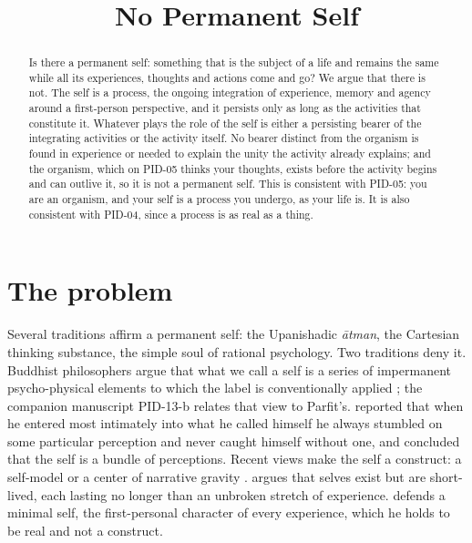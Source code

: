 \documentclass{situationist-preprint}
\title{No Permanent Self}
\begin{document}
\maketitle

\begin{abstract}
Is there a permanent self: something that is the subject of a life and remains the same while all its experiences, thoughts and actions come and go? We argue that there is not. The self is a process, the ongoing integration of experience, memory and agency around a first-person perspective, and it persists only as long as the activities that constitute it. Whatever plays the role of the self is either a persisting bearer of the integrating activities or the activity itself. No bearer distinct from the organism is found in experience or needed to explain the unity the activity already explains; and the organism, which on PID-05 thinks your thoughts, exists before the activity begins and can outlive it, so it is not a permanent self. This is consistent with PID-05: you are an organism, and your self is a process you undergo, as your life is. It is also consistent with PID-04, since a process is as real as a thing.
\end{abstract}

\section{The problem}

Several traditions affirm a permanent self: the Upanishadic \emph{\=atman}, the Cartesian thinking substance, the simple soul of rational psychology. Two traditions deny it. Buddhist philosophers argue that what we call a self is a series of impermanent psycho-physical elements to which the label is conventionally applied \citep{Siderits2003}; the companion manuscript PID-13-b relates that view to Parfit's. \citet[1.4.6]{Hume1739} reported that when he entered most intimately into what he called himself he always stumbled on some particular perception and never caught himself without one, and concluded that the self is a bundle of perceptions. Recent views make the self a construct: a self-model \citep{Metzinger2003} or a center of narrative gravity \citep{Dennett1992}. \citet{Strawson2009} argues that selves exist but are short-lived, each lasting no longer than an unbroken stretch of experience. \citet{Zahavi2005} defends a minimal self, the first-personal character of every experience, which he holds to be real and not a construct.
\end{document}
